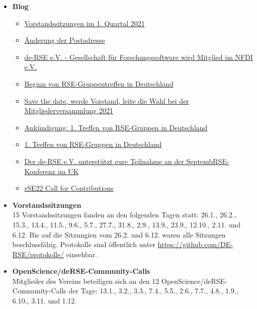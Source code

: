 \begin{itemize}
 \item \textbf{Blog}
 \begin{itemize}
  \item \href{https://de-rse.org/blog/2021/03/18/board-meeting-1.html}{Vorstandssitzungen im 1. Quartal 2021}
  \item \href{https://de-rse.org/blog/2021/04/26/aenderung-der-postadresse.html}{Änderung der Postadresse}
  \item \href{https://de-rse.org/blog/2021/05/20/nfdi-membership.html}{de-RSE e.V. - Gesellschaft für Forschungssoftware wird Mitglied im NFDI e.V.}
  \item \href{https://de-rse.org/blog/2021/06/01/rse-gruppentreffen.html}{Beginn von RSE-Gruppentreffen in Deutschland}
  \item \href{https://de-rse.org/blog/2021/06/10/save-the-date-MV-2021.html}{Save the date, werde Vorstand, leite die Wahl bei der Mitgliederversammlung 2021}
  \item \href{https://de-rse.org/blog/2021/06/19/rse-gruppentreffen.html}{Ankündigung: 1. Treffen von RSE-Gruppen in Deutschland}
  \item \href{https://de-rse.org/blog/2021/08/10/rse-gruppentreffen.html}{1. Treffen von RSE-Gruppen in Deutschland}
  \item \href{https://de-rse.org/blog/2021/09/02/septembRSE-Unterst\%C3\%BCtzung.html}{Der de-RSE e.V. unterstützt eure Teilnahme an der SeptembRSE-Konferenz im UK}
  \item \href{https://de-rse.org/blog/2021/10/04/SE2022-RSE-Track-Call-for-contributions-de.html}{rSE22 Call for Contributions}
 \end{itemize}
 \item \textbf{Vorstandssitzungen}\\
  15 Vorstandssitzungen fanden an den folgenden Tagen statt: 26.1., 26.2., 15.3., 13.4., 11.5., 9.6., 5.7., 27.7., 31.8., 2.9., 13.9., 23.9., 12.10., 2.11. und 6.12.
  Bis auf die Sitzungien vom 26.2. und 6.12. waren alle Sitzungen beschlussfähig.
  Protokolle sind öffentlich unter \href{https://github.com/DE-RSE/protokolle/}{https://github.com/DE-RSE/protokolle/} einsehbar.
 \item \textbf{OpenScience/deRSE-Community-Calls}\\
 Mitglieder des Vereins beteiligen sich an den 12 OpenScience/deRSE-Community-Calls der Tage: 13.1., 3.2., 3.3., 7.4., 5.5., 2.6., 7.7., 4.8., 1.9., 6.10., 3.11. und 1.12.
\end{itemize}

